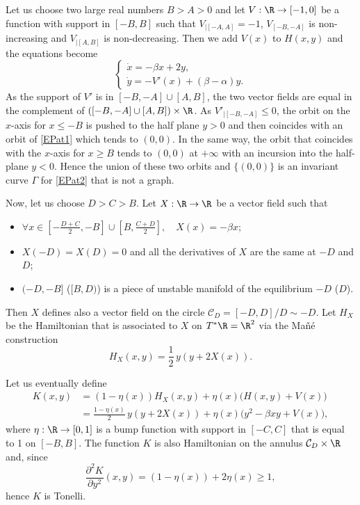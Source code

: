 Let us choose two large real numbers $B>A>0$ and let $V:\R\to [-1, 0]$ be a function with support in $[-B, B]$ such that $V_{|[-A, A]}=-1$, $V_{[-B, -A]}$ is non-increasing and $V_{|[A, B]}$ is non-decreasing. Then we add $V(x)$ to $H(x,y)$ and the equations become
\begin{equation}\label{EPat2}\begin{cases}
\dot x=-\beta x+2y,\\
\dot y=-V'(x)+(\beta-\alpha) y.
\end{cases}\end{equation}
As the support of $V'$ is in $[-B, -A]\cup [A,B]$, the two vector fields are equal in the complement of $([-B, -A]\cup [A, B])\times \R$. As $V'_{|[-B, -A]}\leq 0$, the orbit on the $x$-axis for $x\leq -B$ is pushed to the half plane $y>0$ and then coincides with an orbit of \eqref{EPat1} which tends to $(0, 0)$. In the same way, the orbit that coincides with the $x$-axis for $x\geq B$ tends to $(0, 0)$ at $+\infty$ with an incursion into the half-plane $y<0$. Hence the union of these two orbits and $\{ (0, 0)\}$ is an invariant curve $\Gamma$ for \eqref{EPat2} that is not a graph.

Now, let us choose $D>C>B$. Let $X:\R\to \R$ be a vector field such that
\begin{itemize}
\item $\forall x\in [-\frac{D+C}{2}, -B]\cup [B, \frac{C+D}{2}],\quad X(x)=-\beta x$;
\item $X(-D)=X(D)=0$ and all the derivatives of $X$ are the same at $-D$ and $D$;
\item $(-D, -B]$ (\resp $[B, D)$) is a piece of unstable manifold of the equilibrium $-D$ (\resp $D$).
\end{itemize}
Then $X$ defines also a vector field on the circle ${\mathcal C}_D=[-D, D]/D\sim -D$. Let $H_X$ be the Hamiltonian that is associated to $X$ on $T^*\R=\R^2$ via the Mañé construction
\[
H_X(x, y)=\frac{1}{2}\,y(y+2X(x)).
\]

Let us eventually define
\begin{align*}
K(x,y)&=(1-\eta (x))H_X(x,y)+\eta(x)\big(H(x,y)+V(x)\big)
\\
&=\frac{1-\eta (x)}{2}\,y(y+2X(x))+\eta(x)\big(y^2-\beta xy+V(x)\big),
\end{align*}
where $\eta:\R\to [0, 1]$ is a bump function with support in $[-C, C]$ that is equal to 1 on $[-B, B]$. The function $K$ is also Hamiltonian on the annulus $ {\mathcal C}_D\times \R$ and, since
\[
\frac{\partial^2K}{\partial y^2}(x, y)=(1-\eta(x))+2\eta(x)\geq 1,
\]
hence $K$ is Tonelli.

